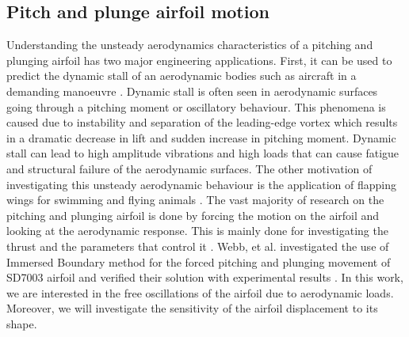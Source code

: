 \subsection{Pitch and plunge airfoil motion}
Understanding the unsteady aerodynamics characteristics of a pitching and plunging airfoil has two major engineering applications. First, it can be used to predict the dynamic stall of an aerodynamic bodies such as aircraft in a demanding manoeuvre \cite{tuncer1998computational}. Dynamic stall is often seen in aerodynamic surfaces going through a pitching moment or oscillatory behaviour. This phenomena is caused due to instability and separation of the leading-edge vortex which results in a dramatic decrease in lift and sudden increase in pitching moment. Dynamic stall can lead to high amplitude vibrations and high loads that can cause fatigue and structural failure of the aerodynamic surfaces. The other motivation of investigating this unsteady aerodynamic behaviour is the application of flapping wings for swimming and flying animals \cite{shyy2008computational}. The vast majority of research on the pitching and plunging airfoil is done by forcing the motion on the airfoil and looking at the aerodynamic response. This is mainly done for investigating the thrust and the parameters that control it \cite{tuncer2000computational, lian2008comparative}. Webb, et al. investigated the use of Immersed Boundary method for the forced pitching and plunging movement of SD7003 airfoil and verified their solution with experimental results \cite{webb2008effects}. In this work, we are interested in the free oscillations of the airfoil due to aerodynamic loads. Moreover, we will investigate the sensitivity of the airfoil displacement to its shape.

